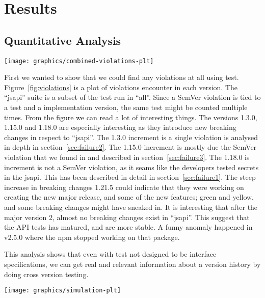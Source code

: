 \section{Results}

\subsection{Quantitative Analysis}

\begin{figure*}
\centering
\texttt{[image: graphics/combined-violations-plt]}
\caption{Violations per version. ``jsapi'' is a subset of violations found in ``all''}
\label{fig:violations}
\end{figure*}

First we wanted to show that we could find any violations at all using
test. Figure~\ref{fig:violations} is a plot of violations encounter in
each version. The ``jsapi'' suite is a subset of the test run in ``all''.
Since a SemVer violation is tied to a test and a implementation version, 
the same test might be counted multiple times. From the figure we can
read a lot of interesting things. The versions 1.3.0, 1.15.0 and 1.18.0 are
especially interesting as they introduce new breaking changes in respect to
``jsapi''.  The 1.3.0 increment is a single violation is analysed in depth in
section~\ref{sec:failure2}. The 1.15.0 increment is mostly due the SemVer
violation that we found in and described in section~\ref{sec:failure3}. The
1.18.0 is increment is not a SemVer violation, as it seams like the developers
tested secrets in the jsapi. This has been described in detail in
section~\ref{sec:failure1}. The steep increase in breaking changes 1.21.5 could
indicate that they were working on creating the new major release, and some of
the new features; green and yellow, and some breaking changes might have
sneaked in. It is interesting that after the major version 2, almost no breaking
changes exist in ``jsapi''. This suggest that the API tests has matured, and
are more stable. A funny anomaly happened in v2.5.0 where the npm stopped
working on that package.

This analysis shows that even with test not designed to be interface
specifications, we can get real and relevant information about a 
version history by doing cross version testing.

\begin{figure*}
\centering
\texttt{[image: graphics/simulation-plt]}
\caption{Simulation of version histories}%
\label{fig:simulation}
\end{figure*}

